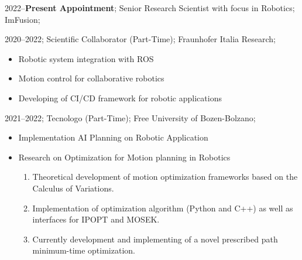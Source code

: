 \addwork%
{%
    2022--\textbf{Present Appointment};%
    Senior Research Scientist with focus in Robotics;%
    ImFusion;%
}%
\addwork%
{%
    2020--2022;%
    Scientific Collaborator (Part-Time);%
    Fraunhofer Italia Research;%
    \begin{itemize}
        \item Robotic system integration with ROS
        \item Motion control for collaborative robotics
        \item Developing of CI/CD framework for robotic applications
    \end{itemize}
}%

\addwork%
{%
    2021--2022;%
    Tecnologo (Part-Time);%
    Free University of Bozen-Bolzano;%
    \begin{itemize}
        \item Implementation AI Planning on Robotic Application
        \item Research on Optimization for Motion planning in Robotics
            \ifdefined\extended
                \begin{enumerate}
                    \item Theoretical development of motion optimization frameworks based on the Calculus of Variations.
                    \item Implementation of optimization algorithm (Python and C++) as well as interfaces for IPOPT and MOSEK.
                    \item Currently development and implementing of a novel prescribed path minimum-time optimization.
                \end{enumerate}
            \fi
    \end{itemize}
}%

